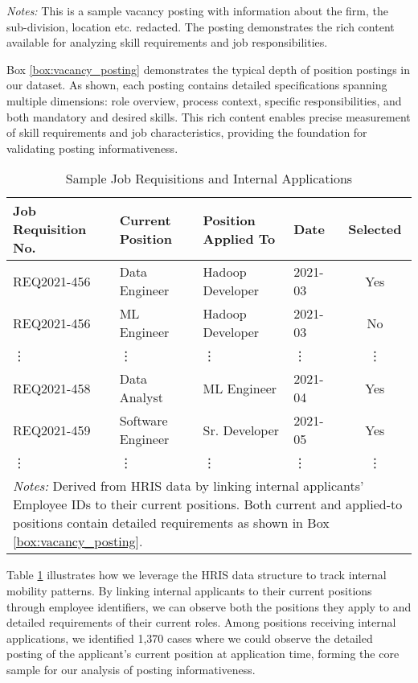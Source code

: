 \noindent \textit{Notes:} This is a sample vacancy posting with information about the firm, the sub-division, location etc. redacted. The posting demonstrates 
the rich content available for analyzing skill requirements and job responsibilities. 

Box \ref{box:vacancy_posting} demonstrates the typical depth of position postings in our dataset. As shown, each posting contains detailed specifications spanning multiple dimensions: role overview, process context, specific responsibilities, and both mandatory and desired skills. This rich content enables precise measurement of skill requirements and job characteristics, providing the foundation for validating posting informativeness.

\begin{table}[t]
    \caption{Sample Job Requisitions and Internal Applications}
    \begin{tabular*}{\textwidth}{@{\extracolsep\fill}llllc}
    \toprule
    Job Requisition No. & Current Position & Position Applied To & Date & Selected \\
    \midrule
    REQ2021-456 & Data Engineer & Hadoop Developer & 2021-03 & Yes \\
    REQ2021-456 & ML Engineer & Hadoop Developer & 2021-03 & No \\
    \vdots & \vdots & \vdots & \vdots & \vdots \\
    REQ2021-458 & Data Analyst & ML Engineer & 2021-04 & Yes \\
    REQ2021-459 & Software Engineer & Sr. Developer & 2021-05 & Yes \\
    \vdots & \vdots & \vdots & \vdots & \vdots \\
    \bottomrule
    \multicolumn{5}{p{\textwidth}}{\footnotesize \textit{Notes:} Derived from HRIS data by linking internal applicants' Employee IDs to their current positions. Both current and applied-to positions contain detailed requirements as shown in Box \ref{box:vacancy_posting}.} \\
    \end{tabular*}
    \label{tab:requisitions}
\end{table}

Table \ref{tab:requisitions} illustrates how we leverage the HRIS data structure to track internal mobility patterns. By linking internal applicants to their current positions through employee identifiers, we can observe both the positions they apply to and detailed requirements of their current roles. Among positions receiving internal applications, we identified 1,370 cases where we could observe the detailed posting of the applicant's current position at application time, forming the core sample for our analysis of posting informativeness.

